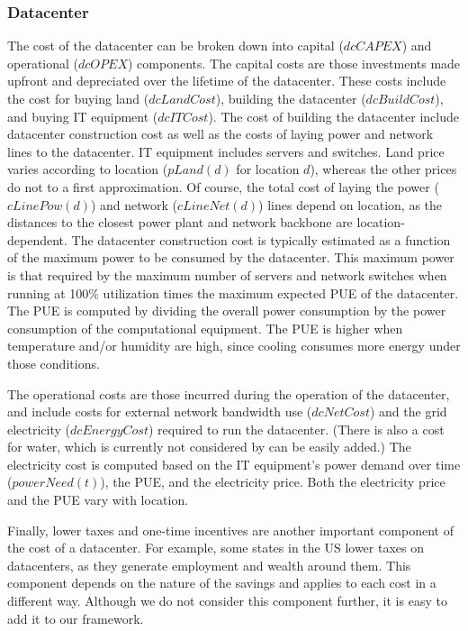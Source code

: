\subsubsection{Datacenter} The cost of the datacenter can be broken down into capital ($dcCAPEX$) and operational ($dcOPEX$) components.  The capital costs are those investments made upfront and depreciated over the lifetime of the datacenter.  These costs include the cost for buying land ($dcLandCost$), building the datacenter ($dcBuildCost$), and buying IT equipment ($dcITCost$).  The cost of building the datacenter include datacenter construction cost as well as the costs of laying power and network lines to the datacenter.  IT equipment includes servers and switches.  Land price varies according to location ($pLand(d)$ for location $d$), whereas the other prices do not to a first approximation.  Of course, the total cost of laying the power ($cLinePow(d)$) and network ($cLineNet(d)$) lines depend on location, as the distances to the closest power plant and network backbone are location-dependent.  The datacenter construction cost is typically estimated as a function of the maximum power to be consumed by the datacenter.  This maximum power is that required by the maximum number of servers and network switches when running at 100\% utilization times the maximum expected PUE of the datacenter.  The PUE is computed by dividing the overall power consumption by the power consumption of the computational equipment.  The PUE is higher when temperature and/or humidity are high, since cooling consumes more energy under those conditions.

The operational costs are those incurred during the operation of the datacenter, and include costs for external network bandwidth use ($dcNetCost$) and the grid electricity ($dcEnergyCost$) required to run the datacenter.  (There is also a cost for water, which is currently not considered by can be easily added.)  The electricity cost is computed based on the IT equipment's power demand over time ($powerNeed(t)$), the PUE, and the electricity price.  Both the electricity price and the PUE vary with location.

Finally, lower taxes and one-time incentives are another important component of the cost of a datacenter.  For example, some states in the US lower taxes on datacenters, as they generate employment and wealth around them.  This component depends on the nature of the savings and applies to each cost in a different way.  Although we do not consider this component further, it is easy to add it to our framework.

